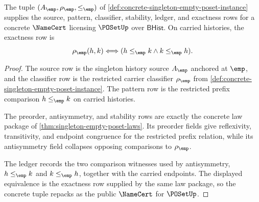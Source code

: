 \begin{theorem}
\label{thm:concrete-singleton-empty-poset-namecert}
The tuple $(A_{\emp},\rho_{\emp},\le_{\emp})$ of
\autoref{def:concrete-singleton-empty-poset-instance} supplies the source,
pattern, classifier, stability, ledger, and exactness rows for a concrete
$\NameCert$ licensing $\POSetUp$ over $\mathsf{BHist}$. On carried histories,
the exactness row is
$$
\rho_{\emp}(h,k)\Longleftrightarrow(h\le_{\emp}k\land k\le_{\emp}h).
$$
\end{theorem}
\begin{proof}
The source row is the singleton history source $A_{\emp}$ anchored at $\emp$,
and the classifier row is the restricted carrier classifier $\rho_{\emp}$ from
\autoref{def:concrete-singleton-empty-poset-instance}. The pattern row is the
restricted prefix comparison $h\le_{\emp}k$ on carried histories.

The preorder, antisymmetry, and stability rows are exactly the concrete law
package of \autoref{thm:singleton-empty-poset-laws}. Its preorder fields give
reflexivity, transitivity, and endpoint congruence for the restricted prefix
relation, while its antisymmetry field collapses opposing comparisons to
$\rho_{\emp}$.

The ledger records the two comparison witnesses used by antisymmetry,
$h\le_{\emp}k$ and $k\le_{\emp}h$, together with the carried endpoints. The
displayed equivalence is the exactness row supplied by the same law package, so
the concrete tuple repacks as the public $\NameCert$ for $\POSetUp$.
\end{proof}

